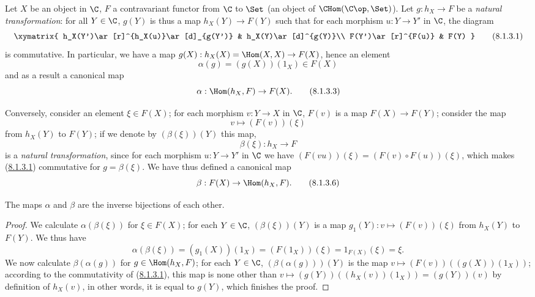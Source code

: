 \begin{env}[8.1.3]
\label{0.8.1.3}
Let $X$ be an object in $\C$, $F$ a contravariant functor from $\C$ to $\Set$
(an object of $\CHom(\C\op,\Set)$). Let $g:h_X\to F$ be a \emph{natural transformation}: for all $Y\in\C$,
$g(Y)$ is thus a map $h_X(Y)\to F(Y)$ such that for each morphism $u:Y\to Y'$ in $\C$,
the diagram
\[
  \xymatrix{
    h_X(Y')\ar[r]^{h_X(u)}\ar[d]_{g(Y')} &
    h_X(Y)\ar[d]^{g(Y)}\\
    F(Y')\ar[r]^{F(u)} &
    F(Y)
  }
  \tag{8.1.3.1}\label{0.8.1.3.1}
\]
is commutative. In particular, we have a map $g(X):h_X(X)=\Hom(X,X)\to F(X)$, hence an element
\[
  \alpha(g)=(g(X))(1_X)\in F(X)
  \tag{8.1.3.2}
\]
and as a result a canonical map
\[
  \alpha:\Hom(h_X,F)\to F(X).
  \tag{8.1.3.3}
\]

Conversely, consider an element $\xi\in F(X)$; for each morphism $v:Y\to X$ in $\C$, $F(v)$ is a
map $F(X)\to F(Y)$; consider the map
\[
  v\mapsto(F(v))(\xi)
  \tag{8.1.3.4}
\]
from $h_X(Y)$ to $F(Y)$; if we denote by $(\beta(\xi))(Y)$ this map,
\[
  \beta(\xi):h_X\to F
  \tag{8.1.3.5}
\]
is a \emph{natural transformation}, since for each morphism $u:Y\to Y'$ in $\C$ we have
$(F(vu))(\xi)=(F(v)\circ F(u))(\xi)$, which makes (\hyperref[0.8.1.3.1]{8.1.3.1}) commutative for $g=\beta(\xi)$.
We have thus defined a canonical map
\[
  \beta:F(X)\to\Hom(h_X,F).
  \tag{8.1.3.6}
\]
\end{env}

\begin{proposition}[8.1.4]
\label{0.8.1.4}
The maps $\alpha$ and $\beta$ are the inverse bijections of each other.
\end{proposition}

\begin{proof}
We calculate $\alpha(\beta(\xi))$ for $\xi\in F(X)$; for each $Y\in\C$, $(\beta(\xi))(Y)$ is a map
$g_1(Y):v\mapsto(F(v))(\xi)$ from $h_X(Y)$ to $F(Y)$. We thus have
\[
  \alpha(\beta(\xi))=(g_1(X))(1_X)=(F(1_X))(\xi)=1_{F(X)}(\xi)=\xi.
\]
We now calculate $\beta(\alpha(g))$ for $g\in\Hom(h_X,F)$; for each $Y\in\C$, $(\beta(\alpha(g)))(Y)$
is the map $v\mapsto(F(v))((g(X))(1_X))$; according to the commutativity of (\hyperref[0.8.1.3.1]{8.1.3.1}), this map
is none other than $v\mapsto(g(Y))((h_X(v))(1_X))=(g(Y))(v)$ by definition of $h_X(v)$, in other words,
it is equal to $g(Y)$, which finishes the proof.
\end{proof}

